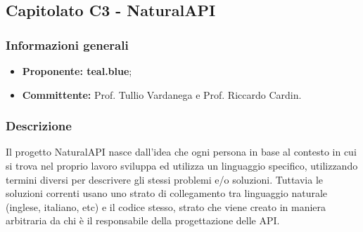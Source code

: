 

    \subsection{Capitolato C3 - NaturalAPI}
       \subsubsection{Informazioni generali}
       \begin{itemize}
           \item \textbf{Proponente: teal.blue};
           \item \textbf{Committente: }Prof. Tullio Vardanega e Prof. Riccardo Cardin.
       \end{itemize}

    \subsubsection{Descrizione}
 		Il progetto NaturalAPI nasce dall'idea che ogni persona in base al contesto in cui si trova nel proprio lavoro sviluppa ed utilizza un linguaggio specifico, utilizzando termini diversi per descrivere gli stessi problemi e/o soluzioni. Tuttavia le soluzioni correnti usano uno strato di collegamento tra linguaggio naturale (inglese, italiano, etc) e il codice stesso, strato che viene creato in maniera arbitraria da chi è il responsabile della progettazione delle API.
